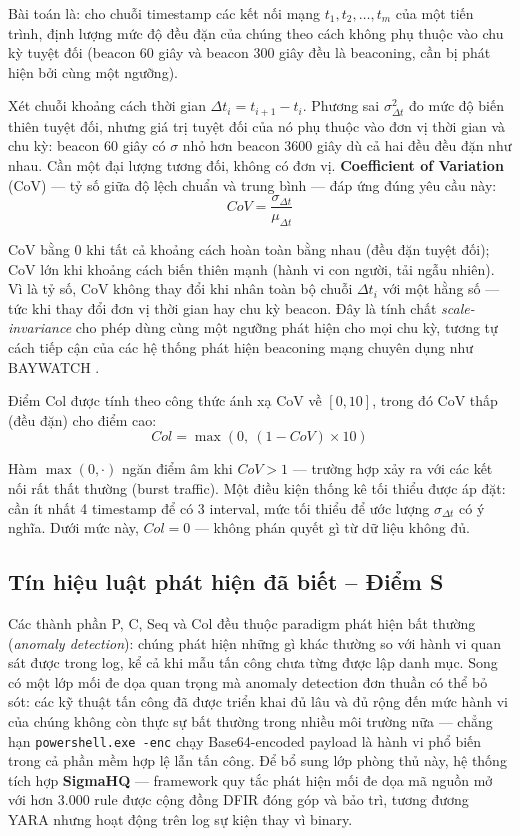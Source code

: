 \documentclass[../main.tex]{subfiles}
\begin{document}
Bài toán là: cho chuỗi timestamp các kết nối mạng $t_1, t_2, \ldots, t_m$ của một tiến trình, định lượng mức độ đều đặn của chúng theo cách không phụ thuộc vào chu kỳ tuyệt đối (beacon 60 giây và beacon 300 giây đều là beaconing, cần bị phát hiện bởi cùng một ngưỡng).

Xét chuỗi khoảng cách thời gian $\Delta t_i = t_{i+1} - t_i$. Phương sai $\sigma_{\Delta t}^2$ đo mức độ biến thiên tuyệt đối, nhưng giá trị tuyệt đối của nó phụ thuộc vào đơn vị thời gian và chu kỳ: beacon 60 giây có $\sigma$ nhỏ hơn beacon 3600 giây dù cả hai đều đều đặn như nhau. Cần một đại lượng tương đối, không có đơn vị. \textbf{Coefficient of Variation} (CoV) — tỷ số giữa độ lệch chuẩn và trung bình — đáp ứng đúng yêu cầu này:
\begin{equation}
    CoV = \frac{\sigma_{\Delta t}}{\mu_{\Delta t}} \tag{1.21}
\end{equation}

CoV bằng 0 khi tất cả khoảng cách hoàn toàn bằng nhau (đều đặn tuyệt đối); CoV lớn khi khoảng cách biến thiên mạnh (hành vi con người, tải ngẫu nhiên). Vì là tỷ số, CoV không thay đổi khi nhân toàn bộ chuỗi $\Delta t_i$ với một hằng số — tức khi thay đổi đơn vị thời gian hay chu kỳ beacon. Đây là tính chất \textit{scale-invariance} cho phép dùng cùng một ngưỡng phát hiện cho mọi chu kỳ, tương tự cách tiếp cận của các hệ thống phát hiện beaconing mạng chuyên dụng như BAYWATCH \cite{baywatch2016}.

Điểm Col được tính theo công thức ánh xạ CoV về $[0, 10]$, trong đó CoV thấp (đều đặn) cho điểm cao:
\begin{equation}
    Col = \max\!\left(0,\ (1 - CoV) \times 10\right) \tag{1.22}
\end{equation}

Hàm $\max(0, \cdot)$ ngăn điểm âm khi $CoV > 1$ — trường hợp xảy ra với các kết nối rất thất thường (burst traffic). Một điều kiện thống kê tối thiểu được áp đặt: cần ít nhất 4 timestamp để có 3 interval, mức tối thiểu để ước lượng $\sigma_{\Delta t}$ có ý nghĩa. Dưới mức này, $Col = 0$ — không phán quyết gì từ dữ liệu không đủ.

\subsection{Tín hiệu luật phát hiện đã biết – Điểm S}
\label{subsection:2.4.6}

Các thành phần P, C, Seq và Col đều thuộc paradigm phát hiện bất thường (\textit{anomaly detection}): chúng phát hiện những gì khác thường so với hành vi quan sát được trong log, kể cả khi mẫu tấn công chưa từng được lập danh mục. Song có một lớp mối đe dọa quan trọng mà anomaly detection đơn thuần có thể bỏ sót: các kỹ thuật tấn công đã được triển khai đủ lâu và đủ rộng đến mức hành vi của chúng không còn thực sự bất thường trong nhiều môi trường nữa — chẳng hạn \texttt{powershell.exe -enc} chạy Base64-encoded payload là hành vi phổ biến trong cả phần mềm hợp lệ lẫn tấn công. Để bổ sung lớp phòng thủ này, hệ thống tích hợp \textbf{SigmaHQ} — framework quy tắc phát hiện mối đe dọa mã nguồn mở với hơn 3.000 rule được cộng đồng DFIR đóng góp và bảo trì, tương đương YARA nhưng hoạt động trên log sự kiện thay vì binary.
\end{document}
